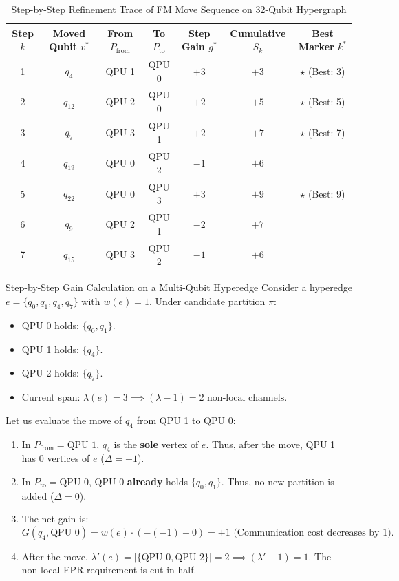 \begin{table}[htbp]
\centering
\caption{Step-by-Step Refinement Trace of FM Move Sequence on 32-Qubit Hypergraph}
\label{tab:fm_step_trace}
\begin{tabular}{c c c c c c c}
\toprule
\textbf{Step $k$} & \textbf{Moved Qubit $v^*$} & \textbf{From $P_{\text{from}}$} & \textbf{To $P_{\text{to}}$} & \textbf{Step Gain $g^*$} & \textbf{Cumulative $S_k$} & \textbf{Best Marker $k^*$} \\
\midrule
1 & $q_4$ & QPU 1 & QPU 0 & $+3$ & $+3$ & $\star$ (Best: 3) \\
2 & $q_{12}$ & QPU 2 & QPU 0 & $+2$ & $+5$ & $\star$ (Best: 5) \\
3 & $q_7$ & QPU 3 & QPU 1 & $+2$ & $+7$ & $\star$ (Best: 7) \\
4 & $q_{19}$ & QPU 0 & QPU 2 & $-1$ & $+6$ & \\
5 & $q_{22}$ & QPU 0 & QPU 3 & $+3$ & $+9$ & $\star$ (Best: 9) \\
6 & $q_9$ & QPU 2 & QPU 1 & $-2$ & $+7$ & \\
7 & $q_{15}$ & QPU 3 & QPU 2 & $-1$ & $+6$ & \\
\bottomrule
\end{tabular}
\end{table}

\begin{examplebox}{Step-by-Step Gain Calculation on a Multi-Qubit Hyperedge}
Consider a hyperedge $e = \{q_0, q_1, q_4, q_7\}$ with $w(e) = 1$. Under candidate partition $\pi$:
\begin{itemize}
    \item QPU 0 holds: $\{q_0, q_1\}$.
    \item QPU 1 holds: $\{q_4\}$.
    \item QPU 2 holds: $\{q_7\}$.
    \item Current span: $\lambda(e) = 3 \implies (\lambda - 1) = 2\text{ non-local channels}$.
\end{itemize}

Let us evaluate the move of $q_4$ from QPU 1 to QPU 0:
\begin{enumerate}
    \item In $P_{\text{from}} = \text{QPU 1}$, $q_4$ is the \textbf{sole} vertex of $e$. Thus, after the move, QPU 1 has 0 vertices of $e$ ($\Delta = -1$).
    \item In $P_{\text{to}} = \text{QPU 0}$, QPU 0 \textbf{already} holds $\{q_0, q_1\}$. Thus, no new partition is added ($\Delta = 0$).
    \item The net gain is:
    \begin{equation}
        G(q_4, \text{QPU 0}) = w(e) \cdot (-(-1) + 0) = +1\text{ (Communication cost decreases by 1)}.
    \end{equation}
    \item After the move, $\lambda'(e) = |\{\text{QPU 0}, \text{QPU 2}\}| = 2 \implies (\lambda' - 1) = 1$. The non-local EPR requirement is cut in half.
\end{enumerate}
\end{examplebox}

